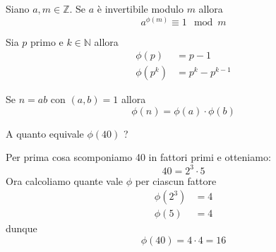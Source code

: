 \begin{theorem}
	Siano $a, m \in \mathbb{Z}$. Se $a$ \`e invertibile modulo $m$ allora
	\begin{equation*}
		a^{\phi(m)} \equiv 1 \mod{m}
	\end{equation*}
\end{theorem}

\begin{theorem}
	Sia $p$ primo e $k \in \mathbb{N}$ allora
	\begin{equation*}
		\begin{array}{ll}
			\phi (p)   & = p - 1           \\
			\phi (p^k) & = p^k - p^{k - 1}
		\end{array}
	\end{equation*}
\end{theorem}

\begin{theorem}
	Se $n = ab$ con $(a, b) = 1$ allora
	\begin{equation*}
		\phi (n) = \phi (a) \cdot \phi (b)
	\end{equation*}
\end{theorem}

\begin{example}
	A quanto equivale $\phi (40)$ ?

	Per prima cosa scomponiamo 40 in fattori primi e otteniamo:
	\begin{equation*}
		40 = 2^3 \cdot 5
	\end{equation*}
	Ora calcoliamo quante vale $\phi$ per ciascun fattore
	\begin{equation*}
		\begin{array}{ll}
			\phi (2^3) & = 4 \\
			\phi (5)   & = 4
		\end{array}
	\end{equation*}
	dunque
	\begin{equation*}
		\phi (40) = 4 \cdot 4 = 16
	\end{equation*}
\end{example}

